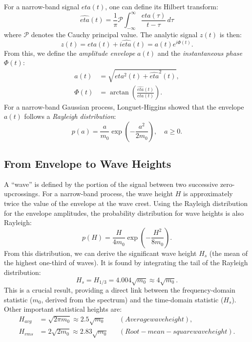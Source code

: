 \documentclass[journal,10pt,twocolumn]{IEEEtran}
\def\eta{eta}%
\def\text#1{#1}%
\begin{document}
    For a narrow-band signal $\eta(t)$, one can define its Hilbert transform:
    \begin{equation}
        \hat{\eta}(t) = \frac{1}{\pi}\mathcal{P}\int_{-\infty}^{\infty}\frac{\eta(\tau)}{t-\tau}\, d\tau
    \end{equation}
    where $\mathcal{P}$ denotes the Cauchy principal value. The analytic signal $z(t)$ is then:
    \begin{equation}
        z(t) = \eta(t) + i\hat{\eta}(t) = a(t)e^{i\Phi(t)}.
    \end{equation}
    From this, we define the \textit{amplitude envelope} $a(t)$ and the \textit{instantaneous phase} $\Phi(t)$:
    \begin{align}
        a(t) &= \sqrt{\eta^2(t) + \hat{\eta}^2(t)},\\
        \Phi(t) &= \arctan\left(\frac{\hat{\eta}(t)}{\eta(t)}\right).
    \end{align}
    For a narrow-band Gaussian process, Longuet-Higgins showed that the envelope $a(t)$ follows a \textit{Rayleigh distribution}:
    \begin{equation}
        p(a) = \frac{a}{m_0}\exp\left(-\frac{a^2}{2m_0}\right), \quad a \ge 0.
    \end{equation}

    \subsection{From Envelope to Wave Heights}
    A ``wave'' is defined by the portion of the signal between two successive zero-upcrossings. For a narrow-band process, the wave height $H$ is approximately twice the value of the envelope at the wave crest. Using the Rayleigh distribution for the envelope amplitudes, the probability distribution for wave heights is also Rayleigh:
    \begin{equation}
        p(H) = \frac{H}{4m_0}\exp\left(-\frac{H^2}{8m_0}\right).
    \end{equation}
    From this distribution, we can derive the significant wave height $H_s$ (the mean of the highest one-third of waves). It is found by integrating the tail of the Rayleigh distribution:
    \begin{equation}
        H_s = H_{1/3} = 4.004\sqrt{m_0} \approx 4\sqrt{m_0}.
    \end{equation}
    This is a crucial result, providing a direct link between the frequency-domain statistic ($m_0$, derived from the spectrum) and the time-domain statistic ($H_s$). Other important statistical heights are:
    \begin{align}
        H_{\text{avg}} &= \sqrt{2\pi m_0} \approx 2.5\sqrt{m_0}
        && \text{(Average wave height)},\\
        H_{\text{rms}} &= 2\sqrt{2m_0} \approx 2.83\sqrt{m_0}
        && \text{(Root-mean-square wave height)}.
    \end{align}
\end{document}
